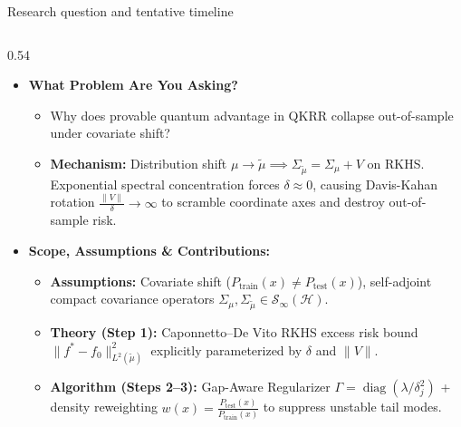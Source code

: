 \documentclass[aspectratio=169, 10pt]{beamer}
\begin{document}
\begin{frame}{Research question and tentative timeline}
\vspace{-0.3cm}
\begin{columns}[T]
    \begin{column}{0.54\textwidth}
        \begin{itemize}\setlength{\itemsep}{2pt}
            \item \textbf{What Problem Are You Asking?}
            \begin{itemize}\setlength{\itemsep}{1pt}
                \item Why does provable quantum advantage in QKRR collapse out-of-sample under covariate shift?
                \item \textbf{Mechanism:} Distribution shift $\mu \to \tilde{\mu} \implies \Sigma_{\tilde{\mu}} = \Sigma_\mu + V$ on RKHS. Exponential spectral concentration forces $\delta \approx 0$, causing Davis-Kahan rotation $\frac{\|V\|}{\delta} \to \infty$ to scramble coordinate axes and destroy out-of-sample risk.
            \end{itemize}

            \item \textbf{Scope, Assumptions \& Contributions:}
            \begin{itemize}\setlength{\itemsep}{1pt}
                \item \textbf{Assumptions:} Covariate shift ($P_{\text{train}}(x) \neq P_{\text{test}}(x)$), self-adjoint compact covariance operators $\Sigma_\mu, \Sigma_{\tilde{\mu}} \in \mathcal{S}_\infty(\mathcal{H})$.
                \item \textbf{Theory (Step 1):} Caponnetto--De Vito RKHS excess risk bound $\|f^* - f_0\|_{L^2(\tilde{\mu})}^2$ explicitly parameterized by $\delta$ and $\|V\|$.
                \item \textbf{Algorithm (Steps 2--3):} Gap-Aware Regularizer $\Gamma = \operatorname{diag}(\lambda / \delta_j^2)$ + density reweighting $w(x) = \frac{P_{\text{test}}(x)}{P_{\text{train}}(x)}$ to suppress unstable tail modes.
            \end{itemize}
        \end{itemize}
    \end{column}


\end{columns}
\end{frame}
\end{document}
